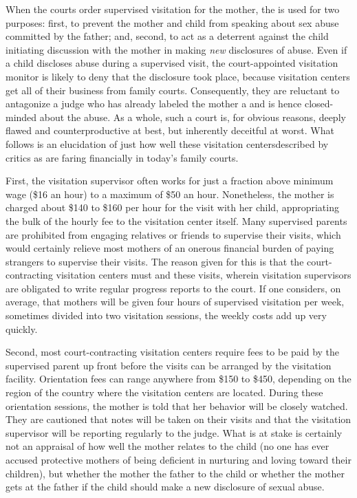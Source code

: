 \noindent{}When the courts order supervised visitation for the mother, the  is used for two purposes: first, to prevent the mother and
child from speaking about sex abuse committed by the father; and, second, to act as a deterrent against the child initiating discussion with the
mother in making \textit{new} disclosures of abuse. 
Even if a child discloses abuse 
during a supervised visit, the court-appointed visitation monitor is likely
to deny that the disclosure took place, because visitation centers get all
of their business from family courts.
Consequently, they are reluctant to
antagonize a judge who has already labeled the mother a 
 and is hence closed-minded about the abuse. 
As a whole, such a
court  is, for obvious reasons, deeply flawed and counterproductive at best, but inherently deceitful at worst.  What follows is an elucidation
of just how well these visitation centers\mdash{}described by
critics as \mdash{}are faring financially in today's
family courts. \pfl{}

\vspace{3em}


\noindent{}First, the visitation supervisor often works for just a fraction above
minimum wage (\$16 an hour) to a maximum of \$50 an hour.
Nonetheless, the mother is charged about \$140 to \$160 per hour for the
visit with her child, appropriating the bulk of the hourly fee to 
the visitation center itself. Many supervised 
parents are prohibited from engaging relatives
or friends to supervise their visits, which would certainly relieve most
mothers of an onerous financial burden of paying strangers to supervise 
their visits. The reason given for this is that
the court-contracting
visitation centers must  and  these visits, wherein visitation
supervisors are obligated to write regular progress reports to the court.
If one considers, on average, that mothers will be given four hours of
supervised visitation per week, sometimes divided into two visitation
sessions, the weekly costs add up very quickly. \pfl{}

Second, most court-contracting visitation centers require  fees to be paid by the supervised parent up front before the
visits can be arranged by the visitation facility. Orientation fees can
range anywhere from \$150 to \$450, depending on the region of the
country where the visitation centers are located. During these orientation sessions, the mother is told that her behavior will be closely
watched. They are cautioned that notes will be taken on their visits
and that the visitation supervisor will be reporting regularly to the judge. What
is at stake is certainly not an appraisal of how well the mother relates
to the child (no one has ever accused protective mothers of being
deficient in nurturing and loving toward their children), but whether the 
mother  the father to the child or whether 
the mother gets  at the father if the child should make a new disclosure of sexual
abuse. \pfl{}


